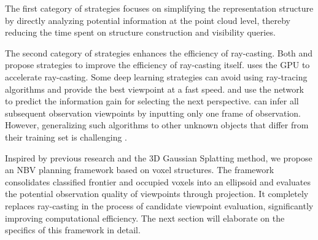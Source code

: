The first category of strategies focuses on simplifying the representation structure by directly analyzing potential information at the point cloud level\cite{border2024surface,zeng2020pc,dhami2023pred}, thereby reducing the time spent on structure construction and visibility queries.

The second category of strategies enhances the efficiency of ray-casting.
Both \cite{vasquez2014view} and \cite{batinovic2022shadowcasting} propose strategies to improve the efficiency of ray-casting itself. \cite{monica2018surfel} uses the GPU to accelerate ray-casting.
Some deep learning strategies can avoid using ray-tracing algorithms and provide the best viewpoint at a fast speed.
\cite{mendoza2020supervised} and \cite{zeng2020pc} use the network to predict the information gain for selecting the next perspective. \cite{pan2022scvp} can infer all subsequent observation viewpoints by inputting only one frame of observation.
However, generalizing such algorithms to other unknown objects that differ from their training set is challenging \cite{border2024surface}.

Inspired by previous research and the 3D Gaussian Splatting method\cite{kerbl20233d}, we propose an NBV planning framework based on voxel structures. 
The framework consolidates classified frontier and occupied voxels into an ellipsoid and evaluates the potential observation quality of viewpoints through projection.
It completely replaces ray-casting in the process of candidate viewpoint evaluation, significantly improving computational efficiency. 
The next section will elaborate on the specifics of this framework in detail.

